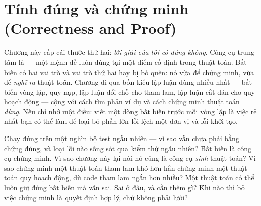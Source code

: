 \documentclass[../../algorithm.tex]{subfiles}
\begin{document}
\chapter{Tính đúng và chứng minh (Correctness and Proof)}

\begin{tomtat}
Chương này cấp cái thước thứ hai: \emph{lời giải của tôi có đúng không}. Công cụ trung tâm là  --- một mệnh đề luôn đúng tại một điểm cố định trong thuật toán. Bất biến có hai vai trò và vai trò thứ hai hay bị bỏ quên: nó vừa để chứng minh, vừa để \emph{nghĩ ra} thuật toán. Chương đi qua bốn kiểu lập luận dùng nhiều nhất --- bất biến vòng lặp, quy nạp, lập luận đổi chỗ cho tham lam, lập luận cắt-dán cho quy hoạch động --- cộng với cách tìm phản ví dụ và cách chứng minh thuật toán \emph{dừng}. Nếu chỉ nhớ một điều: viết một dòng bất biến trước mỗi vòng lặp là việc rẻ nhất bạn có thể làm để loại bỏ phần lớn lỗi lệch một đơn vị và lỗi khởi tạo.
\end{tomtat}

\begin{nentang}
\end{nentang}

\begin{khoigoi}
\h{Chạy đúng trên một nghìn bộ test ngẫu nhiên --- vì sao vẫn chưa phải bằng chứng đúng, và loại lỗi nào sống sót qua kiểm thử ngẫu nhiên?}
\h{Bất biến là công cụ chứng minh. Vì sao chương này lại nói nó cũng là công cụ \emph{sinh} thuật toán?}
\h{Vì sao chứng minh một thuật toán tham lam khó hơn hẳn chứng minh một thuật toán quy hoạch động, dù code tham lam ngắn hơn nhiều?}
\h{Một thuật toán có thể luôn giữ đúng bất biến mà vẫn sai. Sai ở đâu, và cần thêm gì?}
\h{Khi nào thì bỏ việc chứng minh là quyết định hợp lý, chứ không phải lười?}
\end{khoigoi}
\end{document}
